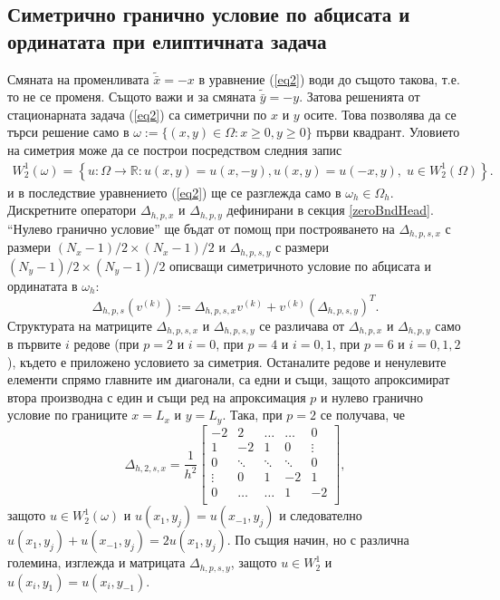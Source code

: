 \documentclass[a4paper]{article}
\newcommand{\be}{\begin{equation}}
\newcommand{\ee}{\end{equation}}
\newcommand{\rf}[1]{(\ref{#1})}
\newcommand{\RR}{\mathbb{R}}
\theoremstyle{remark}
\begin{document}
\subsection{Симетрично гранично условие по абцисата и ординатата при елиптичната задача}\label{symBndHead}
Смяната на променливата $\tilde {\bar x } = -x$ в уравнение \rf{eq2} води до същото такова, т.е. то не се променя. Същото важи и за смяната $\tilde {\bar y } = -y$. Затова решенията от стационарната задача \rf{eq2} са симетрични по $x$ и $y$ осите. Това позволява да се търси решение само в $\omega := \{ (x,y) \in \Omega : x \geq 0, y \geq 0 \}$ първи квадрант. Уловието на симетрия може да се построи посредством следния запис
\begin{align}\label{funSpaceSym}
W^1_2(\omega) =\left\{ u : \Omega \rightarrow \RR  : u(x,y) = u(x,-y), u(x,y) = u(-x,y), \; u \in W^1_2(\Omega) \right\}.
\end{align}
и в последствие уравнението \rf{eq2} ще се разглежда само в $\omega_h \in \Omega_h$. Дискретните оператори $\Delta_{h,p,x}$ и $\Delta_{h,p,y}$ дефинирани в секция \ref{zeroBndHead}. ``Нулево гранично условие''  ще бъдат от помощ при построяването на $\Delta_{h,p,s,x}$ с размери $(N_x-1)/2 \times (N_x-1)/2$ и $\Delta_{h,p,s,y}$ с размери $(N_y-1)/2\times(N_y-1)/2$ описващи симетричното условие по абцисата и ординатата в $\omega_h$:
\be\label{PsnDiscretSym}
\Delta_{h,p,s}(v^{(k)}) := \Delta_{h,p,s,x}  v^{(k)} + v^{(k)} (\Delta_{h,p,s,y})^T.
\ee
Структурата на матриците $\Delta_{h,p,s,x}$ и $\Delta_{h,p,s,y}$ се различава от $\Delta_{h,p,x}$ и $\Delta_{h,p,y}$ само в първите $i$ редове (при $p=2$ и $i=0$, при $p=4$ и $i=0,1$, при $p=6$ и $i=0,1,2$), където е приложено условието за симетрия. Останалите редове и ненулевите елементи спрямо главните им диагонали, са едни и същи, защото апроксимират втора производна с един и същи ред на апроксимация $p$ и нулево гранично условие по границите $x=L_x$ и $y=L_y$. Така, при $p=2$ се получава, че 
\[
\Delta_{h,2,s,x} = \frac{1}{h^2}
\begin{bmatrix}
    -2	       & 2        &     \dots   &   \dots        & 0   \\
    1               & -2            &   1           &   0               & \vdots    \\
        0           & \ddots        &    \ddots    &   \ddots       &  0 \\ 
    \vdots       &     0            &  1     	& -2    	   & 1 \\
    0               & \dots          &  \dots         & 1  	   & -2 \\
\end{bmatrix}
,
\]
защото $u \in W^1_2(\omega)$ и $u(x_1, y_j) = u(x_{-1}, y_j)$ и следователно $u(x_1, y_j) + u(x_{-1}, y_j) = 2 u(x_1, y_j)$. По същия начин, но с различна големина, изглежда и матрицата $\Delta_{h,p,s,y}$, защото $u \in W^1_2$ и $u(x_i, y_1) = u(x_i, y_{-1})$.  
\end{document}
